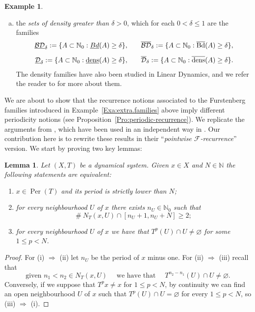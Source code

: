 \documentclass[openright,11pt]{article}
\theoremstyle{plain}
\newtheorem{lemma}[theorem]{Lemma}
\theoremstyle{definition}
\newtheorem{example}[theorem]{Example}
\newcommand{\NN}{\mathbb{N}}
\newcommand{\Fc}{\mathcal{F}}
\newcommand{\Per}{\operatorname{Per}}
\newcommand{\del}{\delta}
\newcommand{\Bdsup}{\overline{\operatorname{Bd}}}
\newcommand{\Bdinf}{\underline{\textup{Bd}}}
\newcommand{\dsup}{\overline{\operatorname{dens}}}
\newcommand{\dinf}{\underline{\operatorname{dens}}}
\newcommand{\BDsup}{\overline{\mathcal{BD}}}
\newcommand{\BDinf}{\underline{\mathcal{BD}}}
\newcommand{\Dsup}{\overline{\mathcal{D}}}
\newcommand{\Dinf}{\underline{\mathcal{D}}}
\begin{document}
\begin{example}
\begin{enumerate}[(a)]
		\item the {\em sets of density greater than $\delta>0$}, which for each $0<\delta\leq 1$ are the families
		\begin{eqnarray}
			\BDinf_{\del} := \{ A \subset \NN_0 : \Bdinf(A)\geq\del \}, &\quad& \BDsup_{\del} := \{ A \subset \NN_0 : \Bdsup(A)\geq\del \},\nonumber\\[5pt]
			\Dinf_{\del} := \{ A \subset \NN_0 : \dinf(A)\geq\del \}, &\quad& \Dsup_{\del} := \{ A \subset \NN_0 : \dsup(A)\geq\del \}.\nonumber
		\end{eqnarray}
		The density families have also been studied in Linear Dynamics, and we refer the reader to \cite{BMPP2016,BMPP2019} for more about them.
	\end{enumerate}
\end{example}

We are about to show that the recurrence notions associated to the Furstenberg families introduced in Example~\ref{Exa:extra.families} above imply different periodicity notions (see Proposition~\ref{Pro:periodic-recurrence}). We replicate the arguments from \cite[Proposition~3]{BMPP2016}, which have been used in an independent way in \cite[Lemma~3.17 and Corollary~3.18]{CarMur2022_arXiv}. Our contribution here is to rewrite these results in their ``{\em pointwise $\Fc$-recurrence}'' version. We start by proving two key lemmas:

\begin{lemma}\label{Lem:periodic-points}
	Let $(X,T)$ be a dynamical system. Given $x \in X$ and $N \in \NN$ the following statements are equivalent:
	\begin{enumerate}[{\em(i)}]
		\item $x \in \Per(T)$ and its period is strictly lower than $N$;
		
		\item for every neighbourhood $U$ of $x$ there exists $n_U \in \NN_0$ such that
		\[
		\# \ N_T(x,U) \cap [n_U+1,n_U+N] \geq 2;
		\]
		
		\item for every neighbourhood $U$ of $x$ we have that $T^p(U)\cap U\neq\varnothing$ for some $1\leq p< N$.
	\end{enumerate}
\end{lemma}
\begin{proof}
	For (i) $\Rightarrow$ (ii) let $n_U$ be the period of $x$ minus one. For (ii) $\Rightarrow$ (iii) recall that
	\[
	\text{given } n_1<n_2 \in N_T(x,U) \quad \text{ we have that } \quad T^{n_2-n_1}(U)\cap U\neq\varnothing.
	\]
	Conversely, if we suppose that $T^px \neq x$ for $1\leq p<N$, by continuity we can find an open neighbourhood $U$ of $x$ such that $T^p(U)\cap U = \varnothing$ for every $1\leq p<N$, so (iii) $\Rightarrow$ (i).
\end{proof}
\end{document}
